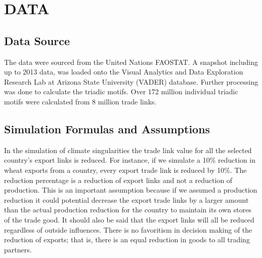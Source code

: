 \chapter{DATA}
\label{dataChapter}
\section{Data Source}
The data were sourced from the United Nations FAOSTAT. A snapshot including up to 2013 data, was loaded onto the Visual Analytics and Data Exploration Research Lab at Arizona State University (VADER) database. Further processing was done to calculate the triadic motifs. Over 172 million individual triadic motifs were calculated from 8 million trade links.\par
\section{Simulation Formulas and Assumptions}
In the simulation of climate singularities the trade link value for all the selected country's export links is reduced. For instance, if we simulate a 10\% reduction in wheat exports from a country, every export trade link is reduced by 10\%. The reduction percentage is a reduction of export links and not a reduction of production. This is an important assumption because if we assumed a production reduction it could potential decrease the export trade links by a larger amount than the actual production reduction for the country to maintain its own stores of the trade good. It should also be said that the export links will all be reduced regardless of outside influences. There is no favoritism in decision making of the reduction of exports; that is, there is an equal reduction in goods to all trading partners.